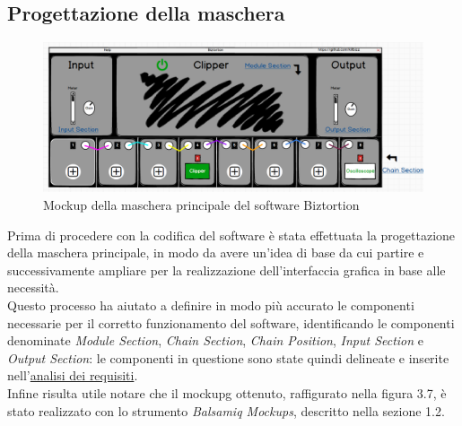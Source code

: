 \subsection{Progettazione della maschera}
\begin{figure}[h!] 
    \centering 
    \includegraphics[width=0.9\columnwidth]{immagini/cap3/mockup1.png}
    \caption{Mockup della maschera principale del software Biztortion}
\end{figure}
Prima di procedere con la codifica del software è stata effettuata la progettazione della maschera principale, in modo da avere un'idea di base da cui partire e successivamente ampliare per la realizzazione dell'interfaccia grafica in base alle necessità. \\
Questo processo ha aiutato a definire in modo più accurato le componenti necessarie per il corretto funzionamento del software, identificando le componenti denominate \textit{Module Section}, \textit{Chain Section}, \textit{Chain Position}, \textit{Input Section} e \textit{Output Section}: le componenti in questione sono state quindi delineate e inserite nell'\hyperref[sez:analisi-requisiti]{analisi dei requisiti}. \\
Infine risulta utile notare che il \gls{mockupg} ottenuto, raffigurato nella figura 3.7, è stato realizzato con lo strumento \textit{Balsamiq Mockups}, descritto nella sezione 1.2.


